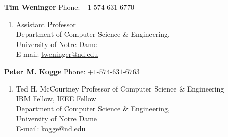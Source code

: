 \documentclass[11pt]{article}
\newenvironment{innerlist}[1][\enskip]%
        {\begin{enumerate}[#1,leftmargin=*,parsep=0pt,itemsep=0pt,topsep=0pt,partopsep=0pt]}
        {\end{enumerate}}
\newcommand{\halfblankline}{\quad\vspace{-0.5\baselineskip}\pagebreak[3]}
\providecommand*\email[1]{\href{mailto:#1}{#1}}
\begin{document}
\textbf{Tim Weninger} \hfill {Phone: +$1$-$574$-$631$-$6770$}
\begin{innerlist}
\item[] Assistant Professor \\
Department of Computer Science \& Engineering,\\
University of Notre Dame \\
E-mail: \email{tweninger@nd.edu}
\end{innerlist}

\halfblankline

\textbf{Peter M. Kogge} \hfill {Phone: +$1$-$574$-$631$-$6763$}
\begin{innerlist}
\item[] Ted H. McCourtney Professor of Computer Science \& Engineering \\
IBM Fellow, IEEE Fellow \\
Department of Computer Science \& Engineering,\\
University of Notre Dame \\
E-mail: \email{kogge@nd.edu}
\end{innerlist}
\end{document}
